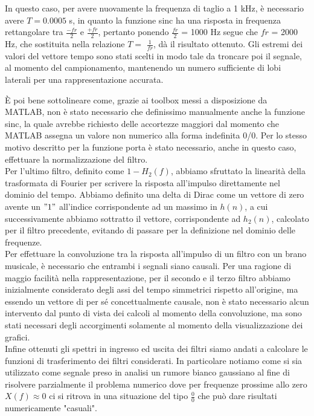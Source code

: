 \documentclass[../main.tex]{subfiles}
\begin{document}
 

In questo caso, per avere nuovamente la frequenza di taglio a 1 kHz, è necessario avere $T = 0.0005$ s, in quanto la funzione sinc ha una risposta in frequenza rettangolare tra $\tfrac{-fr}{2}$ e $\tfrac{+fr}{2}$, pertanto ponendo $\tfrac{fr}{2}$ = 1000 Hz segue che $fr$ = 2000 Hz, che sostituita nella relazione $T = $ $\tfrac{1}{fr}$,  dà il risultato ottenuto. 
Gli estremi dei valori del vettore tempo sono stati scelti in modo tale da troncare poi il segnale, al momento del campionamento, mantenendo un numero sufficiente di lobi laterali per una rappresentazione accurata.

È poi bene sottolineare come, grazie ai toolbox messi a disposizione da MATLAB, non è stato necessario che definissimo manualmente anche la funzione sinc, la quale avrebbe richiesto delle accortezze maggiori dal momento che MATLAB assegna un valore non numerico alla forma indefinita 0/0. Per lo stesso motivo descritto per la funzione porta è stato necessario, anche in questo caso, effettuare la normalizzazione del filtro.\\

Per l’ultimo filtro, definito come $1 - H_2(f)$, abbiamo sfruttato la linearità della trasformata di Fourier per scrivere la risposta all’impulso direttamente nel dominio del tempo. Abbiamo definito una delta di Dirac come un vettore di zero avente un $"1"$ all'indice corrispondente ad un massimo in $h(n)$, a cui successivamente abbiamo sottratto il vettore, corrispondente ad $h_2(n)$, calcolato per il filtro precedente, evitando di passare per la definizione nel dominio
delle frequenze.\\

Per effettuare la convoluzione tra la risposta all’impulso di un filtro con un brano musicale, è necessario che entrambi i segnali siano causali. Per una ragione di maggio facilità nella rappresentazione, per il secondo e il terzo filtro abbiamo inizialmente considerato degli assi del tempo simmetrici rispetto all’origine, ma essendo un vettore di per sé concettualmente causale, non è stato necessario alcun intervento dal punto di vista dei calcoli al momento della convoluzione, ma sono stati necessari degli accorgimenti solamente al momento della visualizzazione dei grafici.\\

Infine ottenuti gli spettri in ingresso ed uscita dei filtri siamo andati a calcolare le funzioni di trasferimento dei filtri considerati. In particolare notiamo come si sia utilizzato come segnale preso in analisi un rumore bianco gaussiano al fine di risolvere parzialmente il problema numerico dove per frequenze prossime allo zero $X(f) \approx 0$ ci si ritrova in una situazione del tipo $\tfrac{0}{0}$ che può dare risultati numericamente "casuali".
\end{document}
